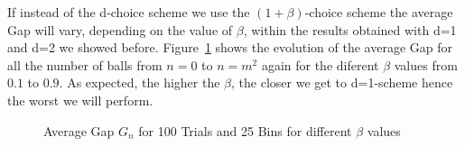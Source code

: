 \documentclass[a4paper, 11pt]{article}
\begin{document}
If instead of the d-choice scheme we use the \( (1+\beta)\)-choice scheme the average Gap will vary, depending on the value of \(\beta\), within the results obtained with d=1 and d=2 we showed before. Figure~\ref{fig:normal_betas} shows the evolution of the average Gap for all the number of balls from $n=0$ to $n=m^2$ again for the  diferent \(\beta\) values from $0.1$ to $0.9$. As expected, the higher the \(\beta\), the closer we get to d=1-scheme hence the worst we will perform.

\begin{figure}[H]
\centering
{}
\caption{Average Gap $G_n$ for 100 Trials and 25 Bins for different $\beta$ values}
\label{fig:normal_betas}
\end{figure}
\end{document}

